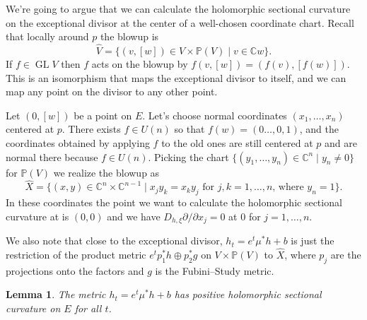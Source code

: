 \documentclass[10pt,a4paper]{amsart}
\newtheorem{lemm}[theo]{Lemma}
\newcommand{\kk}[1]{\mathbb{#1}}
\DeclareMathOperator{\GL}{GL}
\def\hsc{holomorphic sectional curvature}
\def\bl#1{\widehat{#1}}
\begin{document}
We're going to argue that we can calculate the \hsc{} on the exceptional divisor
at the center of a well-chosen coordinate chart.
Recall that locally around $p$ the blowup is
$$
\bl V
= \{ (v,[w]) \in V \times \kk P(V) \mid v \in \kk C w \}.
$$
If $f \in \GL V$ then $f$ acts on the blowup by $f(v, [w]) = (f(v), [f(w)])$.
This is an isomorphism that maps the exceptional divisor to itself, and we can
map any point on the divisor to any other point.

Let $(0, [w])$ be a point on $E$.
Let's choose normal coordinates $(x_1,\ldots,x_n)$ centered at $p$.
There exists $f \in U(n)$ so that $f(w) = (0 \ldots, 0, 1)$, and the
coordinates obtained by applying $f$ to the old ones are still centered at $p$
and are normal there because $f \in U(n)$.
Picking the chart $\{(y_1, \ldots, y_n) \in \kk C^n \mid y_n \not= 0 \}$ for
$\kk P(V)$
we realize the blowup as
$$
\bl X
= \{ (x,y) \in \kk C^n \times \kk C^{n-1}
\mid x_j y_k = x_k y_j \text{ for $j,k = 1,\ldots,n$, where $y_n = 1$}  \}.
$$
In these coordinates the point we want to calculate the \hsc{} at is $(0,0)$
and we have $D_{h,\xi} \partial / \partial x_j = 0$ at $0$ for $j = 1, \ldots, n$.

We also note that close to the exceptional divisor, $h_t = e^t \mu^* h + b$ is
just the restriction of the product metric $e^t p_1^* h \oplus p_2^* g$ on
$V \times \kk P(V)$ to $\bl X$, where $p_j$ are the projections onto the
factors and $g$ is the Fubini--Study metric.


\begin{lemm}
The metric $h_t = e^t \mu^*h + b$ has positive \hsc{} on $E$ for all $t$.
\end{lemm}
\end{document}
